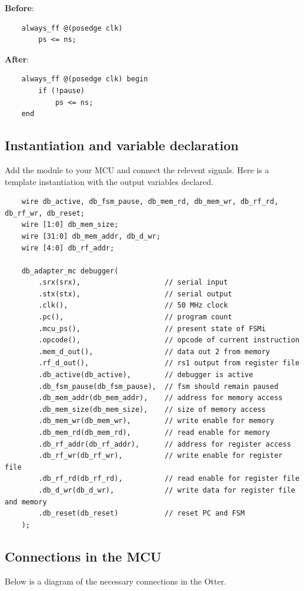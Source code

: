 \documentclass[10pt,a4paper]{article}
\begin{document}
\medskip
\noindent\textbf{Before}:
\begin{verbatim}
    always_ff @(posedge clk)
        ps <= ns;
\end{verbatim}

\noindent\textbf{After}:
\begin{verbatim}
    always_ff @(posedge clk) begin
        if (!pause)
            ps <= ns;
    end
\end{verbatim}

\newpage
\subsection{Instantiation and variable declaration}
Add the module to your MCU and connect the relevent signals. Here is a template instantiation
with the output variables declared.

\begin{verbatim}
    wire db_active, db_fsm_pause, db_mem_rd, db_mem_wr, db_rf_rd, db_rf_wr, db_reset;
    wire [1:0] db_mem_size;
    wire [31:0] db_mem_addr, db_d_wr;
    wire [4:0] db_rf_addr;

    db_adapter_mc debugger(
        .srx(srx),                    // serial input
        .stx(stx),                    // serial output
        .clk(),                       // 50 MHz clock
        .pc(),                        // program count
        .mcu_ps(),                    // present state of FSMi
        .opcode(),                    // opcode of current instruction
        .mem_d_out(),                 // data out 2 from memory
        .rf_d_out(),                  // rs1 output from register file
        .db_active(db_active),        // debugger is active
        .db_fsm_pause(db_fsm_pause),  // fsm should remain paused
        .db_mem_addr(db_mem_addr),    // address for memory access
        .db_mem_size(db_mem_size),    // size of memory access
        .db_mem_wr(db_mem_wr),        // write enable for memory
        .db_mem_rd(db_mem_rd),        // read enable for memory
        .db_rf_addr(db_rf_addr),      // address for register access
        .db_rf_wr(db_rf_wr),          // write enable for register file
        .db_rf_rd(db_rf_rd),          // read enable for register file
        .db_d_wr(db_d_wr),            // write data for register file and memory
        .db_reset(db_reset)           // reset PC and FSM
    );
\end{verbatim}

\newpage
\subsection{Connections in the MCU}
Below is a diagram of the necessary connections in the Otter.
\end{document}
